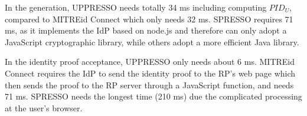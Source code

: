 In the generation, UPPRESSO needs  totally 34 ms including computing $PID_U$, compared to MITREid Connect which only needs 32 ms.
SPRESSO requires 71 ms, as it implements the IdP based on node.js and therefore can only adopt a JavaScript cryptographic library, while others adopt a more efficient Java library.

In the identity proof acceptance, UPPRESSO only needs  about 6 ms. %
MITREid Connect requires the IdP to send the identity proof to the RP's web page which then sends the proof to the RP server through a JavaScript function, and needs 71 ms.
SPRESSO needs the longest time (210 ms) due the complicated processing at the user's browser.



